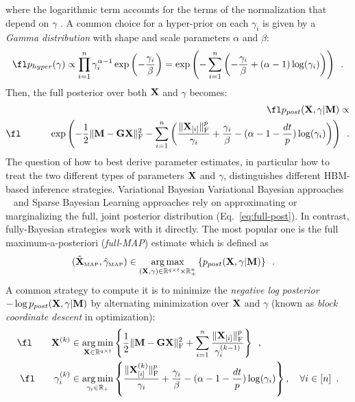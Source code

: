 where the logarithmic term accounts for the terms of the normalization that depend on $\gamma$ \cite{Lu14}. A common choice for a hyper-prior on each $\gamma_i$ is given by a \emph{Gamma distribution} \cite{mackay2003information,KaSo05,CaHaPuSo09,Lucka-etal:2012} with shape and scale parameters $\alpha$ and $\beta$:
\begin{equation} \label{eq:hyper}
\fl \hyper \propto
\prod_{i=1}^n \gamma_i^{\alpha - 1}
\exp \left(- \frac{\gamma_i}{\beta} \right)
=\exp \left( - \sum_{i=1}^n \left( - \frac{\gamma_i}{\beta} + (\alpha - 1) \log(\gamma_i) \right) \right) \enspace.
\end{equation}
Then, the full posterior over both $\mathbf{X}$ and $\gamma$ becomes:
\begin{eqnarray}
\label{eq:full-post}
\fl \hipost \propto \nonumber \\
\fl \hspace{3em} \exp \left( - \frac{1}{2} \fronormsq{\bfM - \bfG \bfX} - \sum_{i=1}^n \left( \frac{\fronorm{\bfX_{[i]}}^p}{\gamma_i} + \frac{\gamma_i}{\beta} - (\alpha - 1 - \frac{dt}{p}) \log(\gamma_i) \right) \right)\enspace.
\end{eqnarray}
The question of how to best derive parameter estimates, in particular how to treat the two different types of parameters $\mathbf{X}$ and $\gamma$, distinguishes different HBM-based inference strategies. Variational Bayesian Variational Bayesian approaches ~\cite{mackay2003information,jordan1999introduction,sato2004hierarchical,FrHaDaKiPhTrHeFlMa08,shervashidze2015learning} and Sparse Bayesian Learning \cite{tipping2001sparse,wipf2004sparse,Wipf-Nagarajan:2009,zhang-rao:2011} approaches rely on approximating or marginalizing the full, joint posterior distribution (Eq.~\ref{eq:full-post}). In contrast, fully-Bayesian strategies \cite{CaHaPuSo09,Lucka-etal:2012} work with it directly. The most popular one is the full maximum-a-posteriori (\emph{full-MAP}) estimate which is defined as
\begin{eqnarray}
(\xMAP,\gamMAP) & \in \argmax_{(\bfX,\gamma) \in\R^{q \times t} \times \R^{n}_+} \left\lbrace \hipost \right\rbrace \enspace.%
\end{eqnarray}
A common strategy  to compute it is to minimize the \emph{negative log posterior} $-\log p_{post}(\mathbf{X},\gamma|\mathbf{M})$ by alternating  minimization over $\mathbf{X}$ and $\gamma$ (known as \emph{block coordinate descent} in optimization):
\begin{eqnarray}
\label{eq:AO}
\fl \qquad  \bfX^{(k)}& \in \argmin_{\bfX\in\R^{q \times t}} \left\lbrace \frac{1}{2} \fronormsq{\bfM - \bfG \bfX} + \sum_{i=1}^n  \frac{\fronorm{\bfX_{[i]}}^p}{\gamma^{(k-1)}_i} \right\rbrace \label{eq:AO-X}\enspace, \\
\fl \qquad \gamma^{(k)}_i & \in \argmin_{\gamma_i\in \R_+} \left\lbrace\frac{\fronorm{\bfX^{(k)}_{[i]}}^p }{\gamma_i} + \frac{\gamma_i}{\beta} - (\alpha - 1 - \frac{dt}{p}) \log(\gamma_i) \right\rbrace, \quad \forall i\in [n] \enspace. \label{eq:AO-gamma}
\end{eqnarray}
